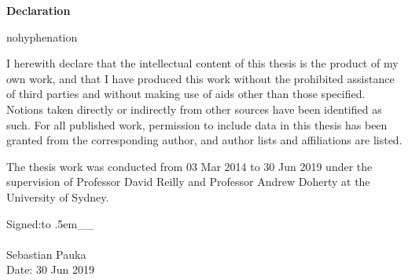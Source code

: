 {}

\bgroup
\LARGE \bf \centering Declaration \\
\egroup

\begin{center}
\begin{minipage}[c]{0.75\textwidth}
\begin{hyphenrules}{nohyphenation}
\begin{onehalfspace}
    \vspace{2em}
    I herewith declare that the intellectual content of this thesis is the product of my own work, and that I have produced this work without the prohibited assistance of third parties and without making use of aids other than those specified. Notions taken directly or indirectly from other sources have been identified as such. For all published work, permission to include data in this thesis has been granted from the corresponding author, and author lists and affiliations are listed.

    \vspace{1em}
    The thesis work was conducted from 03 Mar 2014 to 30 Jun 2019 under the supervision of Professor David Reilly and Professor Andrew Doherty at the University of Sydney.

    \def\dashsign{\xleaders\hbox to .5em{\_}\hfill\_}
    \vspace{5em}
    \hspace*{0mm}Signed:\vspace{2pt}\dashsign\\
    \vspace{1em} \\
    \hspace*{0mm}\phantom{Signed: }Sebastian Pauka\\
    \hspace*{0mm}\phantom{Signed: }Date: 30 Jun 2019
\end{onehalfspace}
\end{hyphenrules}
\end{minipage}
\end{center}
